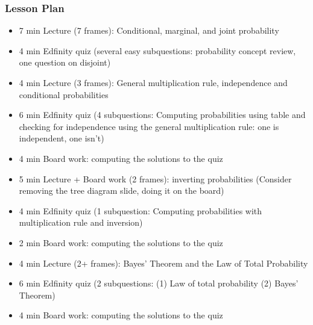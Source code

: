 \begin{frame}
    \frametitle{Lesson Plan}
    \begin{itemize}
        \item 7 min Lecture (7 frames): Conditional, marginal, and joint probability
        \item 4 min Edfinity quiz (several easy subquestions: probability concept review, one question on disjoint)
        \item 4 min Lecture (3 frames): General multiplication rule, independence and conditional probabilities
        \item 6 min Edfinity quiz (4 subquestions: Computing probabilities using table and checking for independence using the general multiplication rule: one is independent, one isn't)
        \item 4 min Board work: computing the solutions to the quiz
        \item 5 min Lecture + Board work (2 frames): inverting probabilities (Consider removing the tree diagram slide, doing it on the board)
        \item 4 min Edfinity quiz (1 subquestion: Computing probabilities with multiplication rule and inversion)
        \item 2 min Board work: computing the solutions to the quiz
        \item 4 min Lecture (2+ frames): Bayes' Theorem and the Law of Total Probability
        \item 6 min Edfinity quiz (2 subquestions: (1) Law of total probability (2) Bayes' Theorem)
        \item 4 min Board work: computing the solutions to the quiz
    \end{itemize}
\end{frame}


